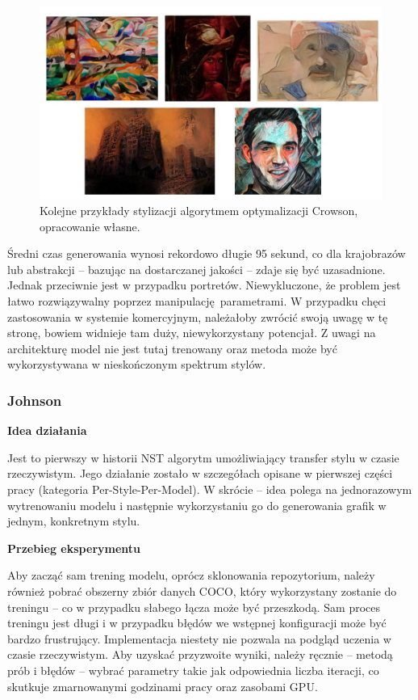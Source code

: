 \documentclass[12pt]{article}
\begin{document}
\begin{figure}[H]
    \centering
    \includegraphics[width=\textwidth]{u21.png}
    \caption{Kolejne przykłady stylizacji algorytmem optymalizacji Crowson, opracowanie własne.}
    \label{fig:14:3}
\end{figure}

Średni czas generowania wynosi rekordowo długie 95 sekund, co dla krajobrazów lub abstrakcji – bazując na dostarczanej jakości – zdaje się być uzasadnione. Jednak przeciwnie jest w przypadku portretów. Niewykluczone, że problem jest łatwo rozwiązywalny poprzez manipulację parametrami. W przypadku chęci zastosowania w systemie komercyjnym, należałoby zwrócić swoją uwagę w tę stronę, bowiem widnieje tam duży, niewykorzystany potencjał. Z uwagi na architekturę model nie jest tutaj trenowany oraz metoda może być wykorzystywana w nieskończonym spektrum stylów.

\subsubsection{Johnson}

\textbf{Idea działania}

Jest to pierwszy w historii NST algorytm umożliwiający transfer stylu w czasie rzeczywistym. Jego działanie zostało w szczegółach opisane w pierwszej części pracy (kategoria Per-Style-Per-Model). W skrócie – idea polega na jednorazowym wytrenowaniu modelu i następnie wykorzystaniu go do generowania grafik w jednym, konkretnym stylu.

\noindent\textbf{Przebieg eksperymentu}

Aby zacząć sam trening modelu, oprócz sklonowania repozytorium, należy również pobrać obszerny zbiór danych COCO, który wykorzystany zostanie do treningu – co w przypadku słabego łącza może być przeszkodą. Sam proces treningu jest długi i w przypadku błędów we wstępnej konfiguracji może być bardzo frustrujący. Implementacja niestety nie pozwala na podgląd uczenia w czasie rzeczywistym. Aby uzyskać przyzwoite wyniki, należy ręcznie – metodą prób i błędów – wybrać parametry takie jak odpowiednia liczba iteracji, co skutkuje zmarnowanymi godzinami pracy oraz zasobami GPU.
\end{document}

